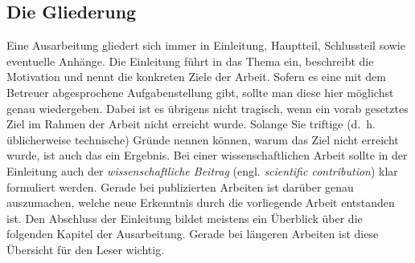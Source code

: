 \subsection{Die Gliederung}
\label{sec:gliederung}

Eine Ausarbeitung gliedert sich immer in Einleitung, Hauptteil, Schlussteil sowie eventuelle Anhänge.
Die Einleitung führt in das Thema ein, beschreibt die Motivation und nennt die konkreten Ziele der Arbeit.
Sofern es eine mit dem Betreuer abgesprochene Aufgabenstellung gibt, sollte man diese hier möglichst genau wiedergeben.
Dabei ist es übrigens nicht tragisch, wenn ein vorab gesetztes Ziel im Rahmen der Arbeit nicht erreicht wurde.
Solange Sie triftige (d.~h. üblicherweise technische) Gründe nennen können, warum das Ziel nicht erreicht wurde, ist auch das ein Ergebnis.
Bei einer wissenschaftlichen Arbeit sollte in der Einleitung auch der \textit{wissenschaftliche Beitrag} (engl. \textit{scientific contribution}) klar formuliert werden.
Gerade bei publizierten Arbeiten ist darüber genau auszumachen, welche neue Erkenntnis durch die vorliegende Arbeit entstanden ist.
Den Abschluss der Einleitung bildet meistens ein Überblick über die folgenden Kapitel der Ausarbeitung. 
Gerade bei längeren Arbeiten ist diese Übersicht für den Leser wichtig.

